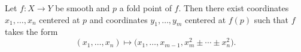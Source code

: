 Let $f: X \to Y$ be smooth and $p$ a fold point of $f$. Then there exist coordinates $x_1, \ldots, x_n$ centered at $p$ and coordinates $y_1, \ldots, y_m$ centered at $f(p)$ such that $f$ takes the form
$$(x_1, \ldots, x_n) \mapsto \bigl(x_1, \ldots, x_{m-1}, x_m^2 \pm \cdots \pm x_n^2\bigr).$$
